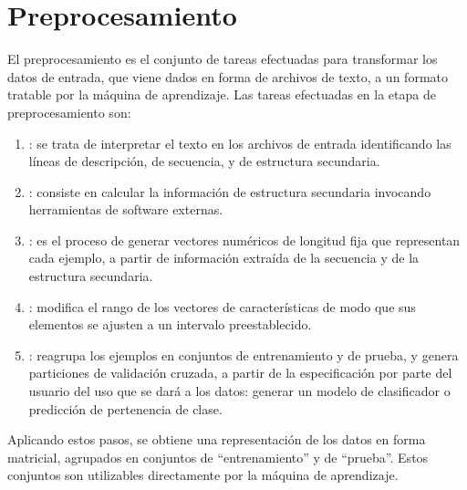 %
%
%
\section{Preprocesamiento}
%
El preprocesamiento es el conjunto de tareas efectuadas para
transformar los datos de entrada, que viene dados en forma de archivos
de texto, a un formato tratable por la máquina de aprendizaje.
Las tareas efectuadas en la etapa de preprocesamiento son:
%
\begin{enumerate}
\item
  : se trata de interpretar el texto
  en los archivos de entrada identificando las líneas de descripción,
  de secuencia, y de estructura secundaria.
\item
  : consiste en calcular la información de estructura
  secundaria invocando herramientas de software externas.
\item
  : es el proceso de generar vectores
  numéricos de longitud fija que representan cada ejemplo, a partir de
  información extraída de la secuencia y de la estructura secundaria.
\item
  : modifica el rango de los vectores de
  características de modo que sus elementos se ajusten a un intervalo
  preestablecido.
\item
  : reagrupa los ejemplos en
  conjuntos de entrenamiento y de prueba, y genera particiones de
  validación cruzada, a partir de la especificación por parte del
  usuario del uso que se dará a los datos: generar un modelo de
  clasificador o predicción de pertenencia de clase.
\end{enumerate}
%
Aplicando estos pasos, se obtiene una representación de los datos en
forma matricial, agrupados en conjuntos de ``entrenamiento'' y de
``prueba''. Estos conjuntos son utilizables directamente por la
máquina de aprendizaje.
